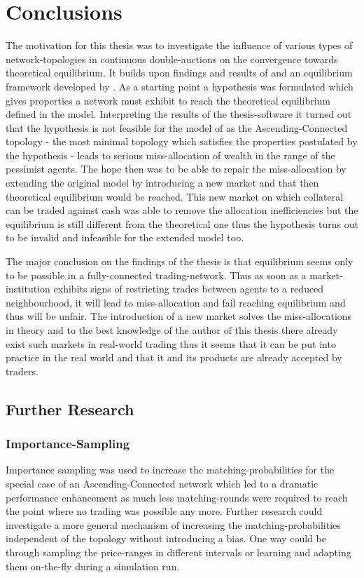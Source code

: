 \documentclass[Bachelorarbeit.tex]{subfiles}
\begin{document}
\chapter{Conclusions}
\label{ch:conclusions}

The motivation for this thesis was to investigate the influence of various types of network-topologies in continuous double-auctions on the convergence towards theoretical equilibrium. It builds upon findings and results of \cite{Breuer2015} and an equilibrium framework developed by \cite{Geanakoplos2009}. As a starting point a hypothesis was formulated which gives properties a network must exhibit to reach the theoretical equilibrium defined in the model. Interpreting the results of the thesis-software it turned out that the hypothesis is not feasible for the model of \cite{Breuer2015} as the Ascending-Connected topology - the most minimal topology which satisfies the properties postulated by the hypothesis - leads to serious miss-allocation of wealth in the range of the pessimist agents. The hope then was to be able to repair the miss-allocation by extending the original model by introducing a new market and that then theoretical equilibrium would be reached. This new market on which collateral can be traded against cash was able to remove the allocation inefficiencies but the equilibrium is still different from the theoretical one thus the hypothesis turns out to be invalid and infeasible for the extended model too.

\bigskip

The major conclusion on the findings of the thesis is that equilibrium seems only to be possible in a fully-connected trading-network. Thus as soon as a market-institution exhibits signs of restricting trades between agents to a reduced neighbourhood, it will lead to miss-allocation and fail reaching equilibrium and thus will be unfair. The introduction of a new market solves the miss-allocations in theory and to the best knowledge of the author of this thesis there already exist such markets in real-world trading thus it seems that it can be put into practice in the real world and that it and its products are already accepted by traders.

\section*{Further Research}

\subsection*{Importance-Sampling}
Importance sampling was used to increase the matching-probabilities for the special case of an Ascending-Connected network which led to a dramatic performance enhancement as much less matching-rounds were required to reach the point where no trading was possible any more. Further research could investigate a more general mechanism of increasing the matching-probabilities independent of the topology without introducing a bias. One way could be through sampling the price-ranges in different intervals or learning and adapting them on-the-fly during a simulation run.
\end{document}
